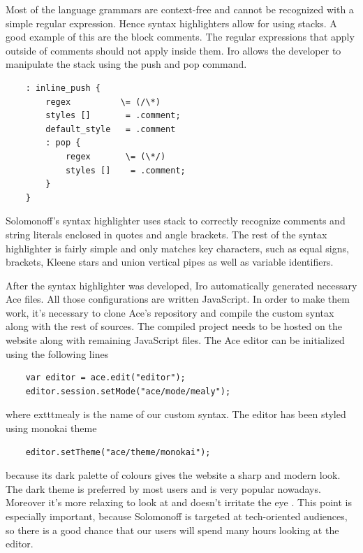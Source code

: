 Most of the language grammars are context-free and cannot be recognized with a simple regular expression. Hence syntax highlighters allow for using stacks. A good example of this are the block comments. The regular expressions that apply outside of comments should not apply inside them. Iro allows the developer to manipulate the stack using the push and pop command.
\begin{lstlisting}
	: inline_push {
		regex          \= (/\*)
		styles []       = .comment;
		default_style   = .comment
		: pop {
			regex       \= (\*/)
			styles []    = .comment;
		}
	}
\end{lstlisting}
Solomonoff's syntax highlighter uses stack to correctly recognize comments and string literals enclosed in quotes and angle brackets. The rest of the syntax highlighter is fairly simple and only matches key characters, such as equal signs, brackets, Kleene stars and union vertical pipes as well as variable identifiers.

After the syntax highlighter was developed, Iro automatically generated necessary Ace files. All those configurations are written JavaScript. In order to make them work, it's necessary to clone Ace's repository and compile the custom syntax along with the rest of sources. The compiled project needs to be hosted on the website along with remaining JavaScript files. The Ace editor can be initialized using the following lines
\begin{lstlisting}
	var editor = ace.edit("editor");
	editor.session.setMode("ace/mode/mealy");
\end{lstlisting}
where     exttt{mealy} is the name of our custom syntax.
The editor has been styled using monokai theme
\begin{lstlisting}
	editor.setTheme("ace/theme/monokai");
\end{lstlisting}
because its dark palette of colours gives the website a sharp and modern look. The dark theme is preferred by most users and is very popular nowadays. Moreover it's more relaxing to look at and doesn't irritate the eye \cite{syntax_highlighter}. This point is especially important, because Solomonoff is targeted at tech-oriented audiences, so there is a good chance that our users will spend many hours looking at the editor. 

